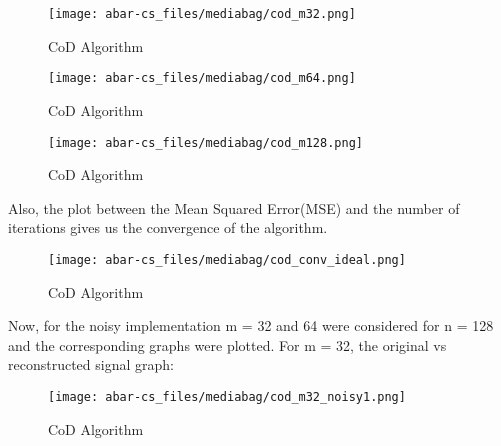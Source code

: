 \documentclass[
  letterpaper,
  DIV=11,
  numbers=noendperiod]{scrartcl}
\begin{document}
\begin{figure}[H]

{\centering \texttt{[image: abar-cs\_files/mediabag/cod\_m32.png]}

}

\caption{CoD Algorithm}

\end{figure}%

\begin{figure}[H]

{\centering \texttt{[image: abar-cs\_files/mediabag/cod\_m64.png]}

}

\caption{CoD Algorithm}

\end{figure}%

\begin{figure}[H]

{\centering \texttt{[image: abar-cs\_files/mediabag/cod\_m128.png]}

}

\caption{CoD Algorithm}

\end{figure}%

Also, the plot between the Mean Squared Error(MSE) and the number of
iterations gives us the convergence of the algorithm.

\begin{figure}[H]

{\centering \texttt{[image: abar-cs\_files/mediabag/cod\_conv\_ideal.png]}

}

\caption{CoD Algorithm}

\end{figure}%

Now, for the noisy implementation m = 32 and 64 were considered for n =
128 and the corresponding graphs were plotted. For m = 32, the original
vs reconstructed signal graph:

\begin{figure}[H]

{\centering \texttt{[image: abar-cs\_files/mediabag/cod\_m32\_noisy1.png]}

}

\caption{CoD Algorithm}

\end{figure}%
\end{document}
